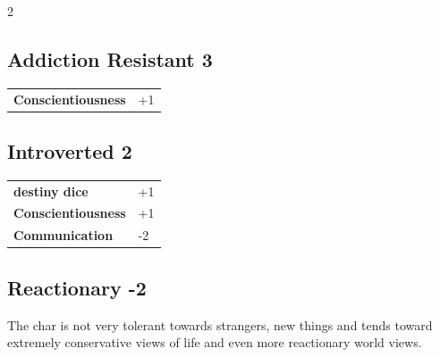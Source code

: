 \begin{multicols}{2}
\begin{tcolorbox}
\end{tcolorbox}

\begin{tcolorbox}
    \subsection*{Addiction Resistant \hfill \small{3 }}
    \tcblower




\begin{tabular}{@{}ll@{}}
    \textbf{Conscientiousness} & +1\\
\end{tabular}


\end{tcolorbox}

\begin{tcolorbox}
    \subsection*{Introverted \hfill \small{2 }}
    \tcblower




\begin{tabular}{@{}ll@{}}
    \textbf{destiny dice} & +1\\
    \textbf{Conscientiousness} & +1\\
    \textbf{Communication} & -2\\
\end{tabular}


\end{tcolorbox}

\begin{tcolorbox}
    \subsection*{Reactionary \hfill \small{-2 }}
    \tcblower
The char is not very tolerant towards strangers, new things and tends toward extremely conservative views of life and even more reactionary world views.


\vspace{3mm}


\end{tcolorbox}
\end{multicols}
